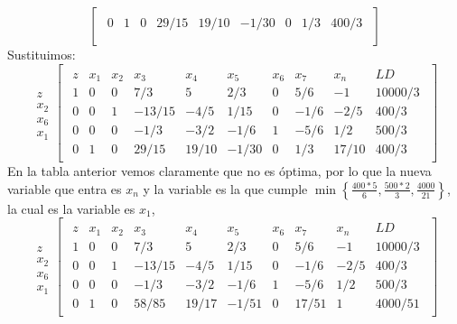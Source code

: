 \documentclass[11pt,letterpaper]{article}
\begin{document}
\begin{enumerate}
\begin{equation}
\begin{bmatrix}
\begin{array}{c||cccccccc}
  0 & 1 & 0 & 29/15 & 19/10 & -1/30 & 0 & 1/3 & 400/3 \\
\end{array}
\end{bmatrix}
\end{equation}
Sustituimos:
\begin{equation} 
\begin{array}{c}
\\
z \\ 
x_2 \\
x_6 \\
x_1
\end{array}
\begin{bmatrix}
\begin{array}{c||ccccccccc}
  z & x_1 & x_2 & x_3 & x_4 & x_5 & x_6 & x_7 & x_n& LD\\ \hline \hline
  1 & 0 & 0 & 7/3 & 5 & 2/3 & 0 & 5/6 & -1 & 10000/3\\ 
  0 & 0 & 1 &-13/15 & -4/5 & 1/15 & 0 &-1/6& -2/5 & 400/3  \\
  0 & 0 & 0 &-1/3 & -3/2 & -1/6 & 1 & -5/6&1/2& 500/3 \\
  0 & 1 & 0 & 29/15 & 19/10 & -1/30 & 0 & 1/3 &17/10&400/3
\end{array}
\end{bmatrix}
\end{equation}
En la tabla anterior vemos claramente que no es óptima, por lo que la nueva variable que entra es $x_n$ y la variable es la que cumple $\min \left\{\frac{400*5}{6}, \frac{500*2}{3},\frac{4000}{21} \right\}$, la cual es la variable es $x_1$,
\begin{equation} 
\begin{array}{c}
\\
z \\ 
x_2 \\
x_6\\
x_1
\end{array}
\begin{bmatrix}
\begin{array}{c||ccccccccc}
  z & x_1 & x_2 & x_3 & x_4 & x_5 & x_6 & x_7 & x_n& LD\\ \hline \hline
  1 & 0 & 0 & 7/3 & 5 & 2/3 & 0 & 5/6 & -1 & 10000/3\\ 
  0 & 0 & 1 &-13/15 & -4/5 & 1/15 & 0 &-1/6& -2/5 & 400/3  \\
  0 & 0 & 0 &-1/3 & -3/2 & -1/6 & 1 & -5/6&1/2& 500/3 \\
  0 & 1 & 0 & 58/85 & 19/17 & -1/51 & 0 &17/51 &1&4000/51
\end{array}

\end{bmatrix}
\end{equation}
\end{enumerate}
\end{document}
